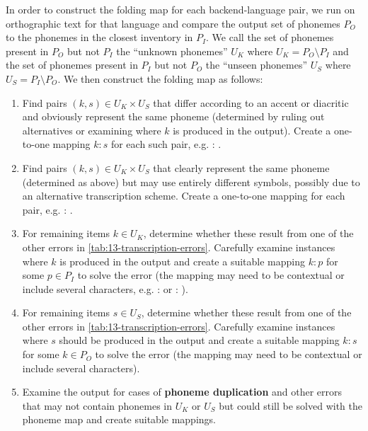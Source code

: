 In order to construct the folding map for each backend-language pair, we run \corpusphonemizer on orthographic text for that language and compare the output set of phonemes $P_O$ to the phonemes in the closest inventory in \phoible $P_I$. We call the set of phonemes present in $P_O$ but not $P_I$ the ``unknown phonemes'' $U_K$ where $U_K = P_O \setminus P_I $ and the set of phonemes present in $P_I$ but not $P_O$ the ``unseen phonemes'' $U_S$ where $U_S = P_I \setminus P_O $. We then construct the folding map as follows:
\begin{enumerate}
    \item Find pairs $(k,s) \in U_K \times U_S$ that differ according to an accent or diacritic and obviously represent the same phoneme (determined by ruling out alternatives or examining where $k$ is produced in the output). Create a one-to-one mapping $k:s$ for each such pair, e.g.  : .
    \item Find pairs $(k,s) \in U_K \times U_S$ that clearly represent the same phoneme (determined as above) but may use entirely different symbols, possibly due to an alternative transcription scheme. Create a one-to-one mapping for each pair, e.g.  : \ttipa{\ae}.
    \item For remaining items $k \in U_K$, determine whether these result from one of the other errors in \cref{tab:13-transcription-errors}. Carefully examine instances where $k$ is produced in the output and create a suitable mapping $k : p$ for some $p \in P_I$ to solve the error (the mapping may need to be contextual or include several characters, e.g. \ttipa{\textrhookschwa} :  or  : ). 
    \item For remaining items $s \in U_S$, determine whether these result from one of the other errors in \cref{tab:13-transcription-errors}. Carefully examine instances where $s$ should be produced in the output and create a suitable mapping $k : s$ for some $k \in P_O$ to solve the error (the mapping may need to be contextual or include several characters). 
    \item Examine the output for cases of \textbf{phoneme duplication} and other errors that may not contain phonemes in $U_K$ or $U_S$ but could still be solved with the phoneme map and create suitable mappings.
\end{enumerate}

